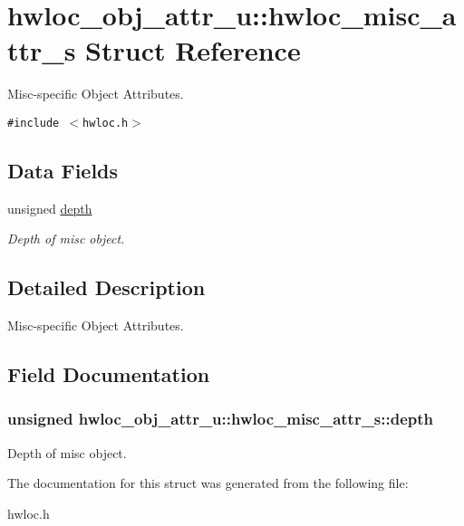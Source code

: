 \hypertarget{structhwloc__obj__attr__u_1_1hwloc__misc__attr__s}{
\section{hwloc\_\-obj\_\-attr\_\-u::hwloc\_\-misc\_\-attr\_\-s Struct Reference}
\label{structhwloc__obj__attr__u_1_1hwloc__misc__attr__s}
}
Misc-specific Object Attributes.  


{\tt \#include $<$hwloc.h$>$}

\subsection*{Data Fields}
\begin{CompactItemize}
\item 
unsigned \hyperlink{structhwloc__obj__attr__u_1_1hwloc__misc__attr__s_67d34faf12434d9732754dcbfe58e4a9}{depth}
\begin{CompactList}\small\item\em Depth of misc object. \item\end{CompactList}\end{CompactItemize}


\subsection{Detailed Description}
Misc-specific Object Attributes. 

\subsection{Field Documentation}
\hypertarget{structhwloc__obj__attr__u_1_1hwloc__misc__attr__s_67d34faf12434d9732754dcbfe58e4a9}{
\subsubsection[{depth}]{\setlength{\rightskip}{0pt plus 5cm}unsigned {\bf hwloc\_\-obj\_\-attr\_\-u::hwloc\_\-misc\_\-attr\_\-s::depth}}}
\label{structhwloc__obj__attr__u_1_1hwloc__misc__attr__s_67d34faf12434d9732754dcbfe58e4a9}


Depth of misc object. 



The documentation for this struct was generated from the following file:\begin{CompactItemize}
\item 
hwloc.h\end{CompactItemize}
